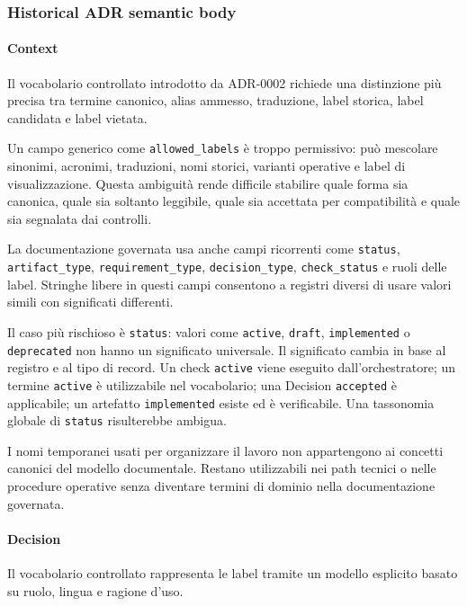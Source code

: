 \documentclass[
  10pt,
]{article}
\begin{document}
\subsubsection{Historical ADR semantic
body}\label{historical-adr-semantic-body-3}

\paragraph{Context}\label{context-6}

Il vocabolario controllato introdotto da ADR-0002 richiede una
distinzione più precisa tra termine canonico, alias ammesso, traduzione,
label storica, label candidata e label vietata.

Un campo generico come \texttt{allowed\_labels} è troppo permissivo: può
mescolare sinonimi, acronimi, traduzioni, nomi storici, varianti
operative e label di visualizzazione. Questa ambiguità rende difficile
stabilire quale forma sia canonica, quale sia soltanto leggibile, quale
sia accettata per compatibilità e quale sia segnalata dai controlli.

La documentazione governata usa anche campi ricorrenti come
\texttt{status}, \texttt{artifact\_type}, \texttt{requirement\_type},
\texttt{decision\_type}, \texttt{check\_status} e ruoli delle label.
Stringhe libere in questi campi consentono a registri diversi di usare
valori simili con significati differenti.

Il caso più rischioso è \texttt{status}: valori come \texttt{active},
\texttt{draft}, \texttt{implemented} o \texttt{deprecated} non hanno un
significato universale. Il significato cambia in base al registro e al
tipo di record. Un check \texttt{active} viene eseguito
dall'orchestratore; un termine \texttt{active} è utilizzabile nel
vocabolario; una Decision \texttt{accepted} è applicabile; un artefatto
\texttt{implemented} esiste ed è verificabile. Una tassonomia globale di
\texttt{status} risulterebbe ambigua.

I nomi temporanei usati per organizzare il lavoro non appartengono ai
concetti canonici del modello documentale. Restano utilizzabili nei path
tecnici o nelle procedure operative senza diventare termini di dominio
nella documentazione governata.

\paragraph{Decision}\label{decision-6}

Il vocabolario controllato rappresenta le label tramite un modello
esplicito basato su ruolo, lingua e ragione d'uso.
\end{document}
